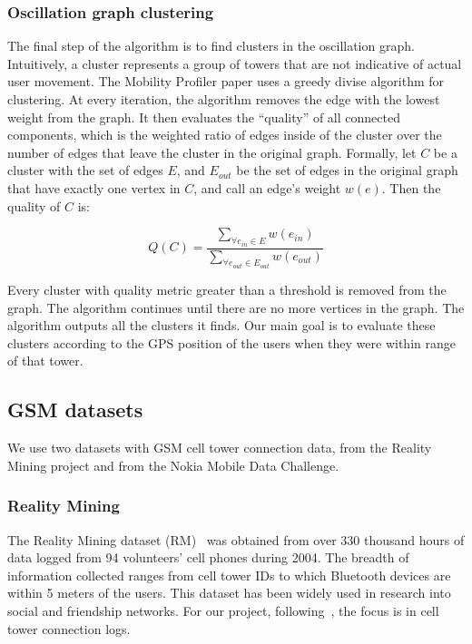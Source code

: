 \documentclass[letterpaper, 12pt, conference]{ieeeconf}
\begin{document}
\subsubsection{Oscillation graph clustering}

The final step of the algorithm is to find clusters in the oscillation graph. 
Intuitively, a cluster represents a group of towers that are not indicative 
of actual user movement. The Mobility Profiler paper uses a greedy divise 
algorithm for clustering. At every iteration, the algorithm removes the edge 
with the lowest weight from the graph. It then evaluates the ``quality'' of 
all connected components, which is the weighted ratio of edges inside of the 
cluster over the number of edges that leave the cluster in the original 
graph. Formally, let $C$ be a cluster with the set of edges $E$, and $E_{out}$
 be the set of edges in the original graph that have exactly one vertex in $C$, and call an edge's weight $w(e)$. Then the quality of $C$ is:

\begin{equation*}
Q(C) = \frac{\displaystyle\sum_{\forall e_{in} \in E}{w(e_{in})}}{
\displaystyle\sum_{\forall e_{out} \in E_{out}}{w(e_{out})}}
\end{equation*}

Every cluster with quality metric greater than a threshold is removed from 
the graph. The algorithm continues until there are no more vertices in the 
graph. The algorithm outputs all the clusters it finds. Our main goal is to 
evaluate these clusters according to the GPS position of the users when they 
were within range of that tower.



\subsection{GSM datasets}

We use two datasets with GSM cell tower connection data, from the Reality 
Mining project and from the Nokia Mobile Data Challenge.

\subsubsection{Reality Mining}

The Reality Mining dataset (RM)~\cite{rm} was obtained from over 330 thousand 
hours of data logged from 94 volunteers' cell phones during 2004. The breadth 
of information collected ranges from cell tower IDs to which 
Bluetooth devices are within 5 meters of the users. This dataset has been 
widely used in research into social and friendship networks. For our project, 
following~\cite{mobilityprofiler}, the focus is in cell tower connection logs.
\end{document}
